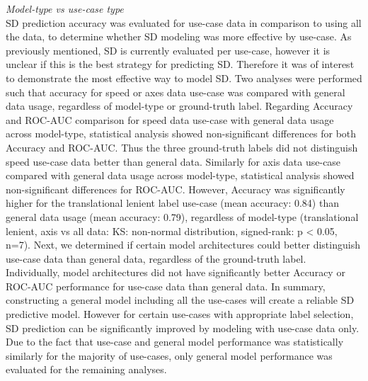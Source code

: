 \documentclass{ieeeaccess}
\begin{document}
\noindent \emph{Model-type vs use-case type}\\
SD prediction accuracy was evaluated for use-case data in comparison to using all the data, to determine whether SD modeling was more effective by use-case. As previously mentioned, SD is currently evaluated per use-case, however it is unclear if this is the best strategy for predicting SD. Therefore it was of interest to demonstrate the most effective way to model SD. Two analyses were performed such that accuracy for speed or axes data use-case was compared with general data usage, regardless of model-type or ground-truth label. Regarding Accuracy and ROC-AUC comparison for speed data use-case with general data usage across model-type, statistical analysis showed non-significant differences for both Accuracy and ROC-AUC. Thus the three ground-truth labels did not distinguish speed use-case data better than general data. Similarly for axis data use-case compared with general data usage across model-type, statistical analysis showed non-significant differences for ROC-AUC. However, Accuracy was significantly higher for the translational lenient label use-case (mean accuracy: 0.84) than general data usage (mean accuracy: 0.79), regardless of model-type (translational lenient, axis vs all data: KS: non-normal distribution, signed-rank: p < 0.05, n=7). Next, we determined if certain model architectures could better distinguish use-case data than general data, regardless of the ground-truth label. Individually, model architectures did not have significantly better Accuracy or ROC-AUC performance for use-case data than general data. In summary, constructing a general model including all the use-cases will create a reliable SD predictive model. However for certain use-cases with appropriate label selection, SD prediction can be significantly improved by modeling with use-case data only. Due to the fact that use-case and general model performance was statistically similarly for the majority of use-cases, only general model performance was evaluated for the remaining analyses.
\end{document}

